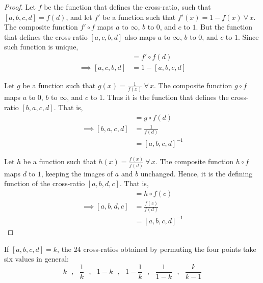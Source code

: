\begin{proof}
  Let $f$ be the function that defines the cross-ratio, such that $[a,b,c,d]=f(d)$, and let
  $f'$ be a function such that $f'(x)=1-f(x)\ \forall\,x$. The composite function $f'\circ f$ maps
  $a$ to $\infty$, $b$ to $0$, and $c$ to $1$. But the function that defines the cross-ratio
  $[a,c,b,d]$ also maps $a$ to $\infty$, $b$ to $0$, and $c$ to $1$. Since such function is
  unique,
  \begin{align*}
    [a,c,b,d] &= f'\circ f(d) \\
    \implies [a,c,b,d] &= 1-[a,b,c,d]
  \end{align*}

  Let $g$ be a function such that $g(x)=\frac{1}{f(x)}\ \forall\,x$. The composite function
  $g\circ f$ maps $a$ to $0$, $b$ to $\infty$, and $c$ to $1$. Thus it is the function that
  defines the cross-ratio $[b,a,c,d]$. That is,
  \begin{align*}
    [b,a,c,d] &= g\circ f(d) \\
    \implies [b,a,c,d] &= \frac{1}{f(d)} \\
                       &= [a,b,c,d]^{-1}
  \end{align*}

  Let $h$ be a function such that $h(x)=\frac{f(x)}{f(d)}\ \forall\,x$. The composite function
  $h\circ f$ maps $d$ to $1$, keeping the images of $a$ and $b$ unchanged. Hence, it is the
  defining function of the cross-ratio $[a,b,d,c]$. That is,
  \begin{align*}
    [a,b,d,c] &= h\circ f(c) \\
    \implies [a,b,d,c] &= \frac{f(c)}{f(d)} \\
                       &= [a,b,c,d]^{-1}
  \end{align*}
\end{proof}

\begin{remark}
  If $[a,b,c,d]=k$, the 24 cross-ratios obtained by permuting the four points take six values
  in general:
  \[
    k \hspace{8pt},\hspace{8pt} \frac{1}{k} \hspace{8pt},
    \hspace{8pt} 1-k \hspace{8pt},\hspace{8pt} 1-\frac{1}{k} \hspace{8pt},
    \hspace{8pt} \frac{1}{1-k} \hspace{8pt},\hspace{8pt} \frac{k}{k-1}
  \]
\end{remark}

